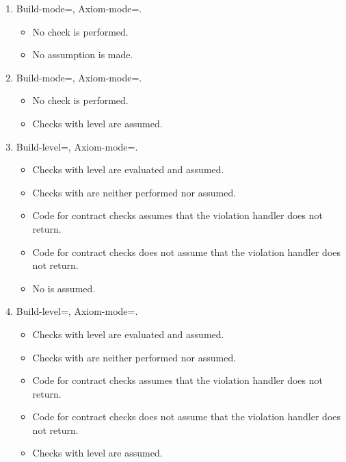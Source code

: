 \begin{enumerate}

\item Build-mode=, Axiom-mode=.
\begin{itemize}
  \item No check is performed.
  \item No assumption is made.
\end{itemize}

\item Build-mode=, Axiom-mode=.
\begin{itemize}
  \item No check is performed.
  \item Checks with  level are assumed.
\end{itemize}

\item Build-level=, Axiom-mode=.
\begin{itemize}
  \item Checks with  level are evaluated and assumed.
  \item Checks with  are neither performed nor assumed.
  \item Code for  contract checks 
	  assumes that the violation handler does not return.
  \item Code for  contract checks
	  does not assume that the violation handler does not return.
  \item No  is assumed.
\end{itemize}

\item Build-level=, Axiom-mode=.
\begin{itemize}
  \item Checks with  level are evaluated and assumed.
  \item Checks with  are neither performed nor assumed.
  \item Code for  contract checks 
	  assumes that the violation handler does not return.
  \item Code for  contract checks
	  does not assume that the violation handler does not return.
  \item Checks with  level are assumed.
\end{itemize}


\end{enumerate}
